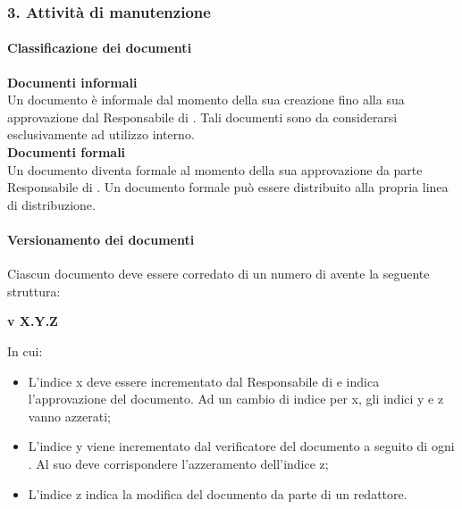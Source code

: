 
\subsubsection{3. Attivit\`a di manutenzione}   %
\paragraph*{Classificazione dei documenti}
\textbf{Documenti informali} \\
Un documento è informale dal momento della sua creazione fino alla sua approvazione dal Responsabile di . Tali documenti sono da considerarsi esclusivamente ad utilizzo interno. \\
\textbf{Documenti formali}  \\
Un documento diventa formale al momento della sua approvazione da parte Responsabile di . Un documento formale pu\`o essere distribuito alla propria linea di distribuzione.

\paragraph*{Versionamento dei documenti}
Ciascun documento deve essere corredato di un numero di  avente la seguente struttura:

\begin{center}
  \textbf{v X.Y.Z}
\end{center}

In cui:
\begin{itemize}
\item L'indice x deve essere incrementato dal Responsabile di  e indica l'approvazione del documento. Ad un cambio di indice per x, gli indici y e z vanno azzerati;
\item L'indice y viene incrementato dal verificatore del documento a seguito di ogni . Al suo  deve corrispondere l'azzeramento dell'indice z;
\item L'indice z indica la modifica del documento da parte di un redattore.
\end{itemize}







